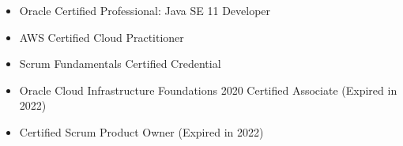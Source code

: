     \begin{itemize}
        \item Oracle Certified Professional: Java SE 11 Developer    
        \item AWS Certified Cloud Practitioner
        \item Scrum Fundamentals Certified Credential
        \item Oracle Cloud Infrastructure Foundations 2020 Certified Associate (Expired in 2022)
        \item Certified Scrum Product Owner (Expired in 2022)    
    \end{itemize}